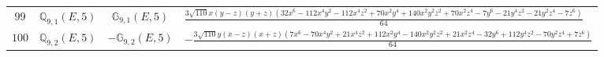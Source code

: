 \documentclass[fleqn,8pt,landscape]{jsarticle}
\begin{document}
\begin{table}[ht!]
\begin{center}
\begin{tabular}{cccl}
$ 99 $ & $ \mathbb{Q}_{9,1}(E,5) $ & $ \mathbb{G}_{9,1}(E,5) $ & $ \frac{3 \sqrt{110} x \left(y - z\right) \left(y + z\right) \left(32 x^{6} - 112 x^{4} y^{2} - 112 x^{4} z^{2} + 70 x^{2} y^{4} + 140 x^{2} y^{2} z^{2} + 70 x^{2} z^{4} - 7 y^{6} - 21 y^{4} z^{2} - 21 y^{2} z^{4} - 7 z^{6}\right)}{64} $ \\
$ 100 $ & $ \mathbb{Q}_{9,2}(E,5) $ & $ -\mathbb{G}_{9,2}(E,5) $ & $ - \frac{3 \sqrt{110} y \left(x - z\right) \left(x + z\right) \left(7 x^{6} - 70 x^{4} y^{2} + 21 x^{4} z^{2} + 112 x^{2} y^{4} - 140 x^{2} y^{2} z^{2} + 21 x^{2} z^{4} - 32 y^{6} + 112 y^{4} z^{2} - 70 y^{2} z^{4} + 7 z^{6}\right)}{64} $ \\
 \hline \hline
\end{tabular}
\end{center}
\end{table}
\end{document}

